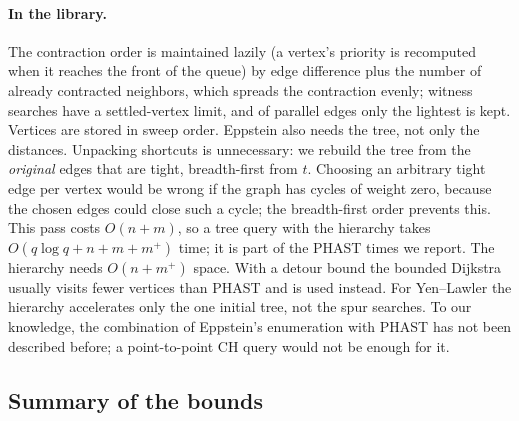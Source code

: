 \documentclass[11pt,a4paper]{article}
\begin{document}
\paragraph{In the library.} The contraction order is maintained lazily (a vertex's priority is recomputed when it
reaches the front of the queue) by edge difference plus the number of already contracted neighbors, which spreads
the contraction evenly; witness searches have a settled-vertex limit, and of parallel edges only the lightest is
kept. Vertices are stored in sweep order. Eppstein also needs the tree, not only the distances. Unpacking shortcuts
is unnecessary: we rebuild the tree from the \emph{original} edges that are tight, breadth-first from $t$. Choosing an
arbitrary tight edge per vertex would be wrong if the graph has cycles of weight zero, because the chosen edges
could close such a cycle; the breadth-first order prevents this. This pass costs $O(n+m)$, so a tree query with
the hierarchy takes $O(q\log q+n+m+m^+)$ time; it is part of the PHAST times we report. The hierarchy needs
$O(n+m^+)$ space. With a detour bound the bounded Dijkstra usually visits fewer vertices than PHAST and is used
instead. For Yen--Lawler the hierarchy accelerates only the one initial tree, not the spur searches. To our
knowledge, the combination of Eppstein's enumeration with PHAST has not been described before; a point-to-point CH
query would not be enough for it.

\subsection{Summary of the bounds}
\end{document}

